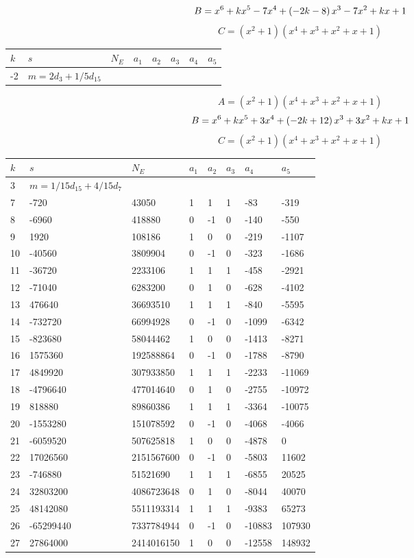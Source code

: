 \documentclass{amsart}
\begin{document}
$$B=x^6
 + k\*x^5
 - 7\*x^4
 + \left(-2\*k
 - 8\right) \*x^3
 - 7\*x^2
 + k\*x
 + 1$$
$$C=(x^2
 + 1)(x^4
 + x^3
 + x^2
 + x
 + 1)$$
\begin{longtable}{|l|l|l|lllll|}
\hline
$k$ & $s$ & $N_E$ & $a_1$ & $a_2$ & $a_3$ & $a_4$ & $a_5$\\
\hline
-2&$m=2d_{3}+1/5d_{15}$&&\multicolumn{5}{c|}{}\\
\hline
\end{longtable}
$$A=(x^2
 + 1)(x^4
 + x^3
 + x^2
 + x
 + 1)$$
$$B=x^6
 + k\*x^5
 + 3\*x^4
 + \left(-2\*k
 + 12\right) \*x^3
 + 3\*x^2
 + k\*x
 + 1$$
$$C=(x^2
 + 1)(x^4
 + x^3
 + x^2
 + x
 + 1)$$
\begin{longtable}{|l|l|l|lllll|}
\hline
$k$ & $s$ & $N_E$ & $a_1$ & $a_2$ & $a_3$ & $a_4$ & $a_5$\\
\hline
3&$m=1/15d_{15}+4/15d_{7}$&&\multicolumn{5}{c|}{}\\
7&-720&43050&1&1&1&-83&-319\\
8&-6960&418880&0&-1&0&-140&-550\\
9&1920&108186&1&0&0&-219&-1107\\
10&-40560&3809904&0&-1&0&-323&-1686\\
11&-36720&2233106&1&1&1&-458&-2921\\
12&-71040&6283200&0&1&0&-628&-4102\\
13&476640&36693510&1&1&1&-840&-5595\\
14&-732720&66994928&0&-1&0&-1099&-6342\\
15&-823680&58044462&1&0&0&-1413&-8271\\
16&1575360&192588864&0&-1&0&-1788&-8790\\
17&4849920&307933850&1&1&1&-2233&-11069\\
18&-4796640&477014640&0&1&0&-2755&-10972\\
19&818880&89860386&1&1&1&-3364&-10075\\
20&-1553280&151078592&0&-1&0&-4068&-4066\\
21&-6059520&507625818&1&0&0&-4878&0\\
22&17026560&2151567600&0&-1&0&-5803&11602\\
23&-746880&51521690&1&1&1&-6855&20525\\
24&32803200&4086723648&0&1&0&-8044&40070\\
25&48142080&5511193314&1&1&1&-9383&65273\\
26&-65299440&7337784944&0&-1&0&-10883&107930\\
27&27864000&2414016150&1&0&0&-12558&148932\\

\end{longtable}
\end{document}
